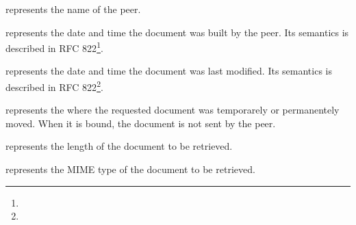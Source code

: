 \documentclass{ozdoc}
\begin{document}
\begin{mozartDESCRIPTION}
 represents the name of the peer.

 represents the date and time the document was built by the peer. Its semantics is described in RFC 822\footnote{}.

 represents the date and time the document was last modified. Its semantics is described in RFC 822\footnote{}.

 represents the  where the requested document was temporarely or permanentely moved. When it is bound, the document is not sent by the peer.

 represents the length of the document to be retrieved.

 represents the MIME type of the document to be retrieved.


\end{mozartDESCRIPTION}
\end{document}
